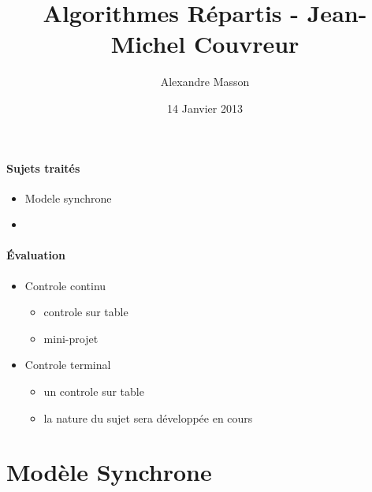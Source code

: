 \documentclass{article}
\title{Algorithmes Répartis - Jean-Michel Couvreur}
\author{Alexandre Masson}
\date{14 Janvier 2013}
\begin{document}
\maketitle
\newpage
\paragraph{Sujets traités}
\begin{itemize}
\item Modele synchrone
\item 
\end{itemize}
\paragraph{Évaluation}
\begin{itemize}
\item Controle continu
\begin{itemize}
\item controle sur table
\item mini-projet
\end{itemize}
\item Controle terminal
\begin{itemize}
\item un controle sur table
\item la nature du sujet sera développée en cours
\end{itemize}
\end{itemize}

\section{Modèle Synchrone}
\end{document}
